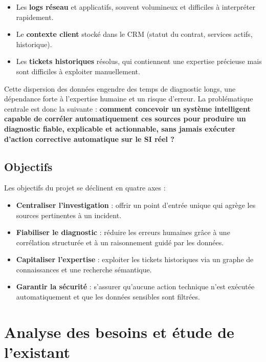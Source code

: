 \begin{itemize}
    \setlength\itemsep{0.1em}
    \setlength\parskip{0pt}
    \setlength\parsep{0pt}
    \item Les \textbf{logs réseau} et applicatifs, souvent volumineux et difficiles à interpréter rapidement.
    \item Le \textbf{contexte client} stocké dans le CRM (statut du contrat, services actifs, historique).
    \item Les \textbf{tickets historiques} résolus, qui contiennent une expertise précieuse mais sont difficiles à exploiter manuellement.
\end{itemize}

Cette dispersion des données engendre des temps de diagnostic longs, une dépendance forte à l'expertise humaine et un risque d'erreur. La problématique centrale est donc la suivante : \textbf{comment concevoir un système intelligent capable de corréler automatiquement ces sources pour produire un diagnostic fiable, explicable et actionnable, sans jamais exécuter d'action corrective automatique sur le SI réel ?}

\subsection{Objectifs}
Les objectifs du projet se déclinent en quatre axes :

\begin{itemize}
    \setlength\itemsep{0.1em}
    \setlength\parskip{0pt}
    \setlength\parsep{0pt}
    \item \textbf{Centraliser l'investigation} : offrir un point d'entrée unique qui agrège les sources pertinentes à un incident.
    \item \textbf{Fiabiliser le diagnostic} : réduire les erreurs humaines grâce à une corrélation structurée et à un raisonnement guidé par les données.
    \item \textbf{Capitaliser l'expertise} : exploiter les tickets historiques via un graphe de connaissances et une recherche sémantique.
    \item \textbf{Garantir la sécurité} : s'assurer qu'aucune action technique n'est exécutée automatiquement et que les données sensibles sont filtrées.
\end{itemize}

\section{Analyse des besoins et étude de l'existant}

